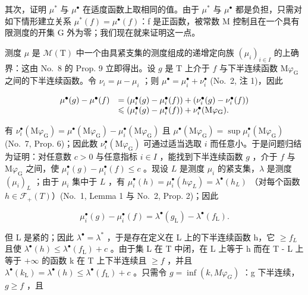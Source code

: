 其次，证明 \(\mu^{*}\) 与 \(\mu^{\bullet}\) 在适度函数上取相同的值。由于 \(\mu^{*}\) 与 \(\mu^{\bullet}\) 都是负担，只需对如下情形建立关系 \(\mu^{*}(f)=\mu^{\bullet}(f)\)：f 是正函数，被常数 M 控制且在一个具有限测度的开集 G 外为零；我们现在就来证明这一点。

测度 \(\mu\) 是 \(\mathcal{M}(\mathrm{T})\) 中一个由具紧支集的测度组成的递增定向族 \((\mu_i)_{i\in I}\) 的上确界：这由 No.~8 的 Prop. 9 立即得出。设 \(g\) 是 \(\mathrm{T}\) 上介于 \(f\) 与下半连续函数 \(\mathrm{M}\varphi_{\mathrm{G}}\) 之间的下半连续函数。令 \(\nu_i = \mu - \mu_i\) ；则 \(\mu^{\bullet} = \mu_i^{\bullet} + \nu_i^{\bullet}\) (No.~2, 注 1)，因此

\[
\begin{array}{r l} \mu^ {\bullet} (g) - \mu^ {\bullet} (f) & = (\mu_ {i} ^ {\bullet} (g) - \mu_ {i} ^ {\bullet} (f)) + (\nu_ {i} ^ {\bullet} (g) - \nu_ {i} ^ {\bullet} (f)) \\ & \leqslant (\mu_ {i} ^ {\bullet} (g) - \mu_ {i} ^ {\bullet} (f)) + \nu_ {i} ^ {\bullet} (\mathrm{M} \varphi_ {\mathrm{G}}). \end{array}
\]

有 \(\nu_{i}^{\bullet}(\mathrm{M}\varphi_{\mathrm{G}}) = \mu^{\bullet}(\mathrm{M}\varphi_{\mathrm{G}}) - \mu_{i}^{\bullet}(\mathrm{M}\varphi_{\mathrm{G}})\) 且 \(\mu^{\bullet}(\mathrm{M}\varphi_{\mathrm{G}}) = \sup \mu_{i}^{\bullet}(\mathrm{M}\varphi_{\mathrm{G}})\) (No.~7, Prop. 6)；因此数 \(\nu_{i}^{\bullet}(\mathrm{M}\varphi_{\mathrm{G}})\) 可通过适当选取 \(i\) 而任意小。于是问题归结为证明：对任意数 \(c > 0\) 与任意指标 \(i \in I\) ，能找到下半连续函数 \(g\) ，介于 \(f\) 与 \(\mathrm{M}\varphi_{\mathrm{G}}\) 之间，使 \(\mu_{i}^{\bullet}(g) - \mu_{i}^{\bullet}(f) \leqslant c\) 。现设 \(L\) 是测度 \(\mu_{i}\) 的紧支集，\(\lambda\) 是测度 \((\mu_{i})_{L}\) ；由于 \(\mu_{i}\) 集中于 \(L\) ，有 \(\mu_{i}^{\bullet}(h) = \mu_{i}^{\bullet}(h\varphi_{L}) = \lambda^{\bullet}(h_{L})\) （对每个函数 \(h \in \mathcal{F}_{+}(T)\)）(No.~1, Lemma 1 与 No.~2, Prop. 2)；因此

\[
\mu_ {i} ^ {\bullet} (g) - \mu_ {i} ^ {\bullet} (f) = \lambda^ {\bullet} (g _ {\mathrm{L}}) - \lambda^ {\bullet} (f _ {\mathrm{L}}).
\]

但 L 是紧的；因此 \(\lambda^{\bullet} = \lambda^{*}\) ，于是存在定义在 L 上的下半连续函数 h，它 \(\geqslant f_{L}\) 且使 \(\lambda^{\bullet}(h) \leqslant \lambda^{\bullet}(f_{\mathrm{L}}) + c\) 。由于集 L 在 T 中闭，在 L 上等于 h 而在 T - L 上等于 \(+\infty\) 的函数 k 在 T 上下半连续且 \(\geqslant f\) ，并且 \(\lambda^{\bullet}(k_{\mathrm{L}}) = \lambda^{\bullet}(h) \leqslant \lambda^{\bullet}(f_{\mathrm{L}}) + c\) 。只需令 \(g = \inf(k, M\varphi_{G})\) ：g 下半连续，\(g \geqslant f\) ，且


